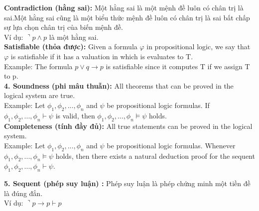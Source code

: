 \documentclass[a4paper]{article}
\begin{document}
\textbf{{\large\hspace{1 cm} Contradiction (hằng sai): }}{\large Một hằng sai là một mệnh đề luôn có chân trị là sai.Một hằng sai cũng là một biểu thức mệnh đề luôn có chân trị là sai bất chấp sự lựa chọn chân trị của biến mệnh đề.\\
	
	\hspace{1.5 cm} Ví dụ: $\urcorner p \wedge p$ là một hằng sai.}\\

\textbf{{\large\hspace{1 cm} Satisfiable (thỏa được): }}
{\large Given a formula $\varphi$ in propositional logic, we say that $\varphi$ is satisfiable if it has a valuation in which is evaluates to T.\\
	
	\hspace{1.5 cm} Example: The formula $p \vee q \rightarrow p$ is satisfiable since it computes T if we
	assign T to p.}\\

\textbf{{\large\hspace{0.5 cm} 4. Soundness (phi mâu thuẫn): }}
{\large All theorems that can be proved in the logical system are true.\\
	
	\hspace{1.5 cm} Example: Let $\phi_{1},\phi_{2}, . . . , \phi_{n}$ and $\psi$ be propositional logic formulas. If $\phi_{1},\phi_{2}, . . . , \phi_{n} \vdash \psi$ is valid, then $\phi_{1},\phi_{2}, . . . , \phi_{n} \models \psi$ holds.}\\

\textbf{{\large\hspace{1 cm} Completeness (tính đầy đủ): }}
{\large All true statements can be proved in the logical system.\\
	
	\hspace{1.5 cm} Example: Let $\phi_{1},\phi_{2}, . . . , \phi_{n}$ and $\psi$ be propositional logic formulas. Whenever $\phi_{1},\phi_{2}, . . . , \phi_{n} \models \psi$ holds, then there exists a natural deduction proof for the sequent $\phi_{1},\phi_{2}, . . . , \phi_{n} \vdash \psi$.}

\textbf{{\large\hspace{0.5 cm} 5. Sequent (phép suy luận) : }}{\large Phép suy luận là phép chứng minh một tiền đề là đúng đắn.\\
	
	\hspace{1 cm} Ví dụ: $\urcorner p \rightarrow p \vdash p$}\\
\end{document}
